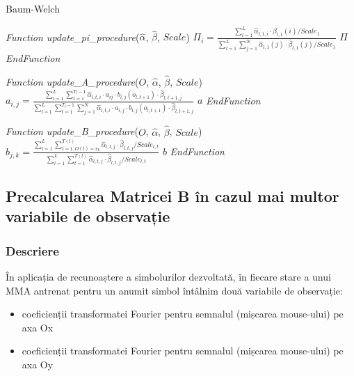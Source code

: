 \documentclass[12pt]{article}
\begin{document}
\begin{algorithm}[H]
  \caption{Baum-Welch}
  \label{alg-baum-welch-2}
  \begin{algorithmic}[1]
    \STATE \emph{Function update\_pi\_procedure}($\hat{\alpha}$,
    $\hat{\beta}$, $Scale$)  \STATE $\Pi_i =
    \frac{\displaystyle\sum_{l=1}^{L}\hat{\alpha}_{l,1,i} \cdot
      \hat{\beta}_{l,1}(i) / Scale_1}
    {\displaystyle\sum_{l=1}^{L}\sum_{j=1}^{N}{\hat{\alpha}_{l,1}(j)
        \cdot \hat{\beta}_{l,1}(j) / Scale_1}}$
    \ENDFOR
    \RETURN $\Pi$ \STATE \emph{EndFunction}
  \end{algorithmic}

  \begin{algorithmic}[1]
    \vspace*{0.5em} \STATE \emph{Function update\_A\_procedure}($O$,
    $\hat{\alpha}$, $\hat{\beta}$, $Scale$) 
     \STATE $a_{i,j} =
    \frac{\displaystyle\sum_{l=1}^{L}\sum_{t=1}^{T_l-1}{
        \hat{\alpha}_{l,t,i}\cdot a_{ij} \cdot b_{l,j}(o_{l,t+1}) \cdot
        \hat{\beta}_{l,t+1,j}}}
    {\displaystyle\sum_{l=1}^{L}\sum_{t=1}^{T_l-1}\sum_{j=1}^{N}{\hat{\alpha}_{l,t,i}\cdot
        a_{i,j} \cdot b_{l,j}(o_{l,t+1}) \cdot \hat{\beta}_{l,t+1,j}}}$
    \ENDFOR
    \ENDFOR
    \RETURN $a$ \STATE \emph{EndFunction}
  \end{algorithmic}

  \begin{algorithmic}[1]
    \vspace*{0.5em} \STATE \emph{Function update\_B\_procedure}($O$, $\hat{\alpha}$,
    $\hat{\beta}$, $Scale$)  
    \STATE $b_{j,k} =
    \frac{\displaystyle\sum_{l=1}^{L}\sum_{t=1,O(t)=v_k}^{T(l)}
      {\hat{\alpha}_{l,t,j} \cdot \hat{\beta}_{l,t,j} / Scale_{l,t}}}
    {\displaystyle\sum_{l=1}^{L}\sum_{t=1}^{T(l)}
      {\hat{\alpha}_{l,t,j} \cdot \hat{\beta}_{l,t,j} / Scale_{l,t}}}$
    \ENDFOR
    \ENDFOR
    \RETURN $b$ \STATE \emph{EndFunction}
  \end{algorithmic}
\end{algorithm}

\subsection{Precalcularea Matricei B în cazul mai multor variabile de observație}
\label{sec:b-matrix-precom}


\subsubsection{Descriere}
În aplicația de recunoaștere a simbolurilor dezvoltată, în fiecare stare a unui MMA antrenat pentru
un anumit simbol întâlnim două variabile de observație:
\begin{itemize}
	\setlength{\itemsep}{-0.25em}
	\item coeficienții transformatei Fourier pentru semnalul (mișcarea mouse-ului) pe axa Ox
	\item coeficienții transformatei Fourier pentru semnalul (mișcarea mouse-ului) pe axa Oy
\end{itemize}
\end{document}

